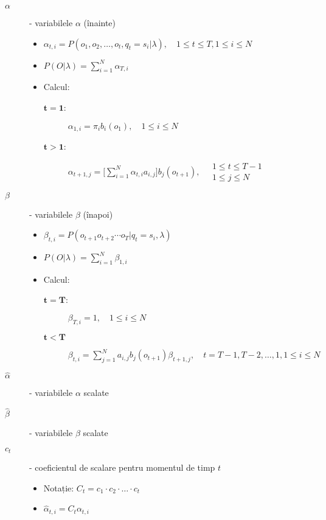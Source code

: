 \documentclass[12pt]{article}
\begin{document}
\begin{description}
\item[$\alpha$] - variabilele $\alpha$ (înainte)
  \begin{itemize}
  \item $\alpha_{t,i}=P(o_1,o_2,\ldots,o_t, q_t = s_i \vert \lambda), \quad  \scriptstyle{1 \le t \le T, 1 \le i \le N}$
  \item $P(O \vert \lambda) = \displaystyle\sum_{i=1}^{N}\alpha_{T,i}$
  \item Calcul:
    \begin{description}
    \item[$\mathbf{t=1}$:] $\alpha_{1,i}=\pi_ib_i(o_1), \quad \scriptstyle{1 \le i \le N}$
    \item[$\mathbf{t>1}$:] $\alpha_{t+1,j}=\Big[
        \displaystyle\sum_{i=1}^{N}\alpha_{t,i}a_{i,j}\Big]
        b_{j}(o_{t+1}), \quad \substack{1 \le t \le T-1\\1\le j \le N}$ 
    \end{description}
  \end{itemize}
\item[$\beta$] - variabilele $\beta$ (înapoi)
  \begin{itemize}
  \item $\beta_{t,i}=P(o_{t+1} o_{t+2} \cdots o_{T} \vert q_t = s_i,
      \lambda)$
    \item $P(O \vert \lambda) = \displaystyle\sum_{i=1}^{N}\beta_{1,i}$
    \item Calcul:
      \begin{description}
      \item[$\mathbf{t=T}$:] $\beta_{T,i}=1,\scriptstyle{\quad 1 \le i \le N}$
      \item[$\mathbf{t<T}$] $\beta_{t,i}=\displaystyle\sum_{j=1}^{N}a_{i,j}b_j(o_{t+1})\beta_{t+1,j},
    \quad \scriptstyle{t = T-1, T-2, \ldots , 1, 1 \le i \le N}$
      \end{description}
  \end{itemize}
\item[$\hat{\alpha}$] - variabilele $\alpha$ scalate
\item[$\hat{\beta}$] - variabilele $\beta$ scalate
\item[$c_t$] - coeficientul de scalare pentru momentul de timp $t$
  \begin{itemize}
  \item Notație: $C_t = c_1 \cdot c_2 \cdot \ldots \cdot c_t$
  \item $\hat{\alpha}_{t,i} = C_t\alpha_{t,i}$
  \end{itemize}
\end{description}  
\end{document}

